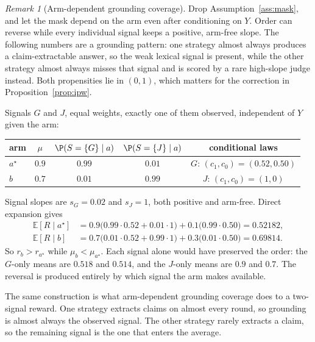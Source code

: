 \documentclass{article}
\theoremstyle{definition}
\theoremstyle{remark}
\newtheorem{remark}[theorem]{Remark}
\newcommand{\E}{\mathbb{E}}
\begin{document}
\begin{remark}[Arm-dependent grounding coverage]\label{rem:coverage}
Drop Assumption~\ref{ass:mask}, and let the mask depend on the arm even after conditioning on $Y$. Order can reverse while every individual signal keeps a positive, arm-free slope. The following numbers are a grounding pattern: one strategy almost always produces a claim-extractable answer, so the weak lexical signal is present, while the other strategy almost always misses that signal and is scored by a rare high-slope judge instead. Both propensities lie in $(0,1)$, which matters for the correction in Proposition~\ref{prop:ipw}.

Signals $G$ and $J$, equal weights, exactly one of them observed, independent of $Y$ given the arm:
\begin{center}
\begin{tabular}{lcccc}
\hline
arm & $\mu$ & $\P(S=\{G\}\mid a)$ & $\P(S=\{J\}\mid a)$ & conditional laws\\
\hline
$a^\star$ & $0.9$ & $0.99$ & $0.01$ & $G$: $(c_1,c_0)=(0.52,0.50)$\\
$b$ & $0.7$ & $0.01$ & $0.99$ & $J$: $(c_1,c_0)=(1,0)$\\
\hline
\end{tabular}
\end{center}
Signal slopes are $s_G=0.02$ and $s_J=1$, both positive and arm-free. Direct expansion gives
\begin{align*}
\E[R\mid a^\star]
&=0.9\big(0.99\cdot 0.52+0.01\cdot 1\big)+0.1\big(0.99\cdot 0.50\big)
=0.52182,\\[0.25em]
\E[R\mid b]
&=0.7\big(0.01\cdot 0.52+0.99\cdot 1\big)+0.3\big(0.01\cdot 0.50\big)
=0.69814.
\end{align*}
So $r_b>r_{a^\star}$ while $\mu_b<\mu_{a^\star}$. Each signal alone would have preserved the order: the $G$-only means are $0.518$ and $0.514$, and the $J$-only means are $0.9$ and $0.7$. The reversal is produced entirely by which signal the arm makes available.

The same construction is what arm-dependent grounding coverage does to a two-signal reward. One strategy extracts claims on almost every round, so grounding is almost always the observed signal. The other strategy rarely extracts a claim, so the remaining signal is the one that enters the average.
\end{remark}
\end{document}
